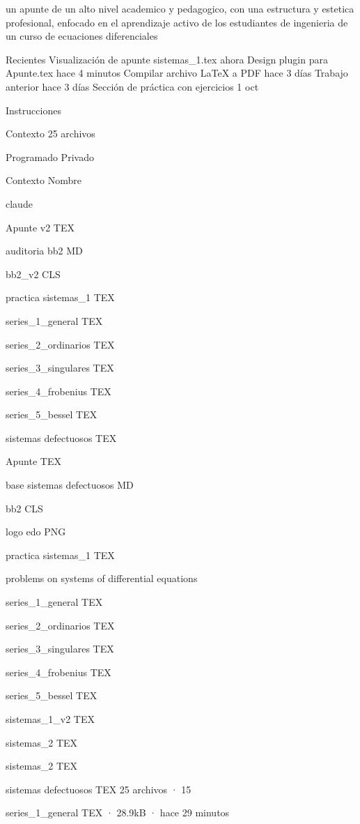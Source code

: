 
un apunte de un alto nivel academico y pedagogico, con una estructura y estetica profesional, enfocado en el aprendizaje activo de los estudiantes de ingenieria de un curso de ecuaciones diferenciales




Recientes
Visualización de apunte sistemas_1.tex
ahora
Design plugin para Apunte.tex
hace 4 minutos
Compilar archivo LaTeX a PDF
hace 3 días
Trabajo anterior
hace 3 días
Sección de práctica con ejercicios
1 oct

Instrucciones

Contexto
25 archivos

Programado
Privado

Contexto
Nombre	

claude

Apunte v2
TEX

auditoria bb2
MD

bb2_v2
CLS

practica sistemas_1
TEX

series_1_general
TEX

series_2_ordinarios
TEX

series_3_singulares
TEX

series_4_frobenius
TEX

series_5_bessel
TEX

sistemas defectuosos
TEX

Apunte
TEX

base sistemas defectuosos
MD

bb2
CLS

logo edo
PNG

practica sistemas_1
TEX

problems on systems of differential equations

series_1_general
TEX

series_2_ordinarios
TEX

series_3_singulares
TEX

series_4_frobenius
TEX

series_5_bessel
TEX

sistemas_1_v2
TEX

sistemas_2
TEX

sistemas_2
TEX

sistemas defectuosos
TEX
25 archivos · 15%

series_1_general
TEX · 28.9kB · hace 29 minutos
 
